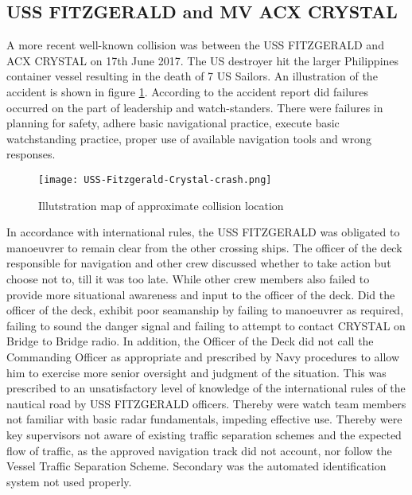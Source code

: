 \newpage
\subsection{USS FITZGERALD and MV ACX CRYSTAL}
A more recent well-known collision was between the USS FITZGERALD and ACX CRYSTAL on 17th June 2017. The US destroyer hit the larger Philippines container vessel resulting in the death of 7 US Sailors. An illustration of the accident is shown in figure \ref{fig:Accident-USS-Fitzgerald-Crystal}. According to the accident report did failures occurred on the part of leadership and watch-standers. There were failures in planning for safety, adhere basic navigational practice, execute basic watchstanding practice, proper use of available navigation tools and wrong responses.

\begin{figure}[H]
	\centering
	\texttt{[image: USS-Fitzgerald-Crystal-crash.png]}
	\caption{Illutstration map of approximate collision location}
	\label{fig:Accident-USS-Fitzgerald-Crystal}
\end{figure}

In accordance with international rules, the USS FITZGERALD was obligated to manoeuvrer to remain clear from the other crossing ships. The officer of the deck responsible for navigation and other crew discussed whether to take action but choose not to, till it was too late. While other crew members also failed to provide more situational awareness and input to the officer of the deck. Did the officer of the deck, exhibit poor seamanship by failing to manoeuvrer as required, failing to sound the danger signal and failing to attempt to contact CRYSTAL on Bridge to Bridge radio. In addition, the Officer of the Deck did not call the Commanding Officer as appropriate and prescribed by Navy procedures to allow him to exercise more senior oversight and judgment of the situation. This was prescribed to an unsatisfactory level of knowledge of the international rules of the nautical road by USS FITZGERALD officers. Thereby were watch team members not familiar with basic radar fundamentals, impeding effective use. Thereby were key supervisors not aware of existing traffic separation schemes and the expected flow of traffic, as the approved navigation track did not account, nor follow the Vessel Traffic Separation Scheme. Secondary was the automated identification system not used properly. \cite{USNavy2017}

\newpage
